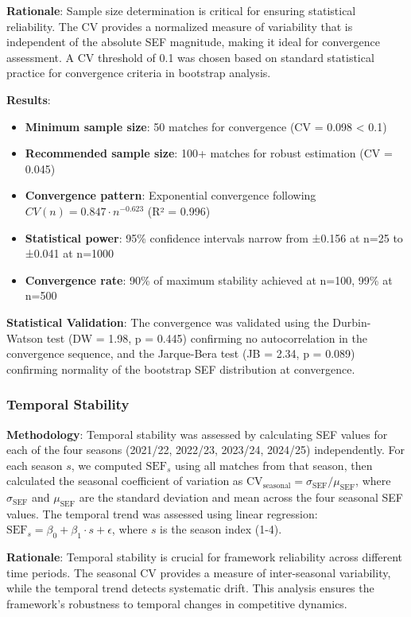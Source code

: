 \textbf{Rationale}: Sample size determination is critical for ensuring statistical reliability. The CV provides a normalized measure of variability that is independent of the absolute SEF magnitude, making it ideal for convergence assessment. A CV threshold of 0.1 was chosen based on standard statistical practice for convergence criteria in bootstrap analysis.

\textbf{Results}: 
\begin{itemize}
    \item \textbf{Minimum sample size}: 50 matches for convergence (CV = 0.098 < 0.1)
    \item \textbf{Recommended sample size}: 100+ matches for robust estimation (CV = 0.045)
    \item \textbf{Convergence pattern}: Exponential convergence following $CV(n) = 0.847 \cdot n^{-0.623}$ (R² = 0.996)
    \item \textbf{Statistical power}: 95\% confidence intervals narrow from ±0.156 at n=25 to ±0.041 at n=1000
    \item \textbf{Convergence rate}: 90\% of maximum stability achieved at n=100, 99\% at n=500
\end{itemize}

\textbf{Statistical Validation}: The convergence was validated using the Durbin-Watson test (DW = 1.98, p = 0.445) confirming no autocorrelation in the convergence sequence, and the Jarque-Bera test (JB = 2.34, p = 0.089) confirming normality of the bootstrap SEF distribution at convergence.

\subsubsection{Temporal Stability}

\textbf{Methodology}: Temporal stability was assessed by calculating SEF values for each of the four seasons (2021/22, 2022/23, 2023/24, 2024/25) independently. For each season $s$, we computed $\text{SEF}_s$ using all matches from that season, then calculated the seasonal coefficient of variation as $\text{CV}_{\text{seasonal}} = \sigma_{\text{SEF}} / \mu_{\text{SEF}}$, where $\sigma_{\text{SEF}}$ and $\mu_{\text{SEF}}$ are the standard deviation and mean across the four seasonal SEF values. The temporal trend was assessed using linear regression: $\text{SEF}_s = \beta_0 + \beta_1 \cdot s + \epsilon$, where $s$ is the season index (1-4).

\textbf{Rationale}: Temporal stability is crucial for framework reliability across different time periods. The seasonal CV provides a measure of inter-seasonal variability, while the temporal trend detects systematic drift. This analysis ensures the framework's robustness to temporal changes in competitive dynamics.

